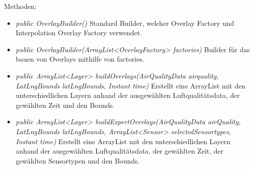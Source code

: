 Methoden:
\begin{itemize} 
    \item \emph{public OverlayBuilder()} Standard Builder, welcher Overlay Factory und Interpolation Overlay Factory verwendet.
    \item \emph{public OverlayBuilder(ArrayList<OverlayFactory> factories)} Builder für das bauen von Overlays mithilfe von factories.
    \item \emph{public ArrayList<Layer> buildOverlays(AirQualityData airquality, LatLngBounds latLngBounds, Instant time)} Erstellt eine ArrayList mit den unterschiedlichen Layern anhand der ausgewählten Luftqualitätsdata, der gewählten Zeit und den Bounds.
    \item \emph{public ArrayList<Layer> buildExpertOverlays(AirQualityData airQuality, LatLngBounds latLngBounds, ArrayList<Sensor> selectedSensortypes, Instant time)}  Erstellt eine ArrayList mit den unterschiedlichen Layern anhand der ausgewählten Luftqualitätsdata, der gewählten Zeit, der gewählten Sensortypen und den Bounds.
\end{itemize}